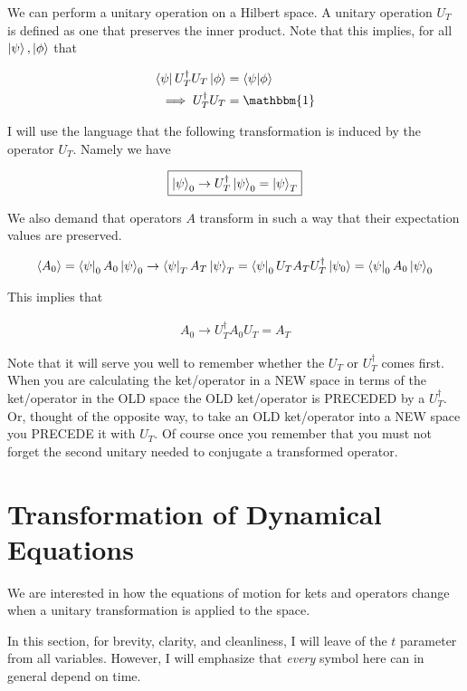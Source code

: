 \documentclass[12pt]{article}
\begin{document}
We can perform a unitary operation on a Hilbert space. A unitary operation $U_T$ is defined as one that preserves the inner product. Note that this implies, for all $\ket{\psi}, \ket{\phi}$ that

\begin{align}
\bra{\psi}U_T^{\dag} U_T \ket{\phi} &= \braket{\psi | \phi}\\
\implies U_T^{\dag}U_T &= \mathbbm{1}
\end{align}


I will use the language that the following transformation is induced by the operator $U_T$. Namely we have

\begin{align}
\boxed{\ket{\psi}_0 \rightarrow U_T^{\dag}\ket{\psi}_0 = \ket{\psi}_T}
\end{align}

We also demand that operators $A$ transform in such a way that their expectation values are preserved.

\begin{align}
\braket{A_0} = \bra{\psi}_0 A_0\ket{\psi}_0 \rightarrow \bra{\psi}_T A_T \ket{\psi}_T = \bra{\psi}_0 U_T A_T U_T^{\dag}\ket{\psi_0} =  \bra{\psi}_0 A_0 \ket{\psi}_0
\end{align}

This implies that

\begin{align}
\boxed{A_0 \rightarrow U_T^{\dag} A_0 U_T = A_T}
\end{align}

Note that it will serve you well to remember whether the $U_T$ or $U_T^{\dag}$ comes first. When you are calculating the ket/operator in a NEW space in terms of the ket/operator in the OLD space the OLD ket/operator is PRECEDED by a $U_T^{\dag}$. Or, thought of the opposite way, to take an OLD ket/operator into a NEW space you PRECEDE it with $U_T$. Of course once you remember that you must not forget the second unitary needed to conjugate a transformed operator.

\section{Transformation of Dynamical Equations}

We are interested in how the equations of motion for kets and operators change when a unitary transformation is applied to the space. 

In this section, for brevity, clarity, and cleanliness, I will leave of the $t$ parameter from all variables. However, I will emphasize that \emph{every} symbol here can in general depend on time.
\end{document}
